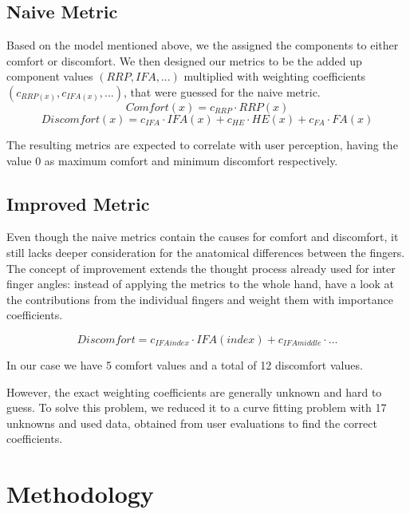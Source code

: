 \documentclass{sig-alternate-05-2015}
\begin{document}
\subsection{Naive Metric}


Based on the model mentioned above\cite{vink2012editorial}, we the assigned the components to either comfort or discomfort. We then designed our metrics to be the added up component values \begin{math}(RRP, IFA, ...)\end{math} multiplied with weighting coefficients \begin{math}(c_{RRP(x)}, c_{IFA(x)}, ...)\end{math}, that were guessed for the naive metric.
	\[
	Comfort(x) = c_{RRP}\cdot RRP(x)
	\]
	\[
	Discomfort(x) = c_{IFA}\cdot IFA(x)  +  c_{HE}\cdot HE(x)  +  c_{FA}\cdot FA(x)
	\]

The resulting metrics are expected to correlate with user perception, having the value 0 as maximum comfort and minimum discomfort respectively.


\subsection{Improved Metric}

Even though the naive metrics contain the causes for comfort and discomfort, it still lacks deeper consideration for the anatomical differences between the fingers.
The concept of improvement extends the thought process already used for inter finger angles: instead of applying the metrics to the whole hand, have a look at the contributions from the individual fingers and weight them with importance coefficients. 

	\[
	Discomfort = c_{IFAindex}\cdot IFA(index)  +  c_{IFAmiddle}\cdot...
	\]

In our case we have 5 comfort values and a total of 12 discomfort values. 

However, the exact weighting coefficients are generally unknown and hard to guess. To solve this problem, we reduced it to a curve fitting problem with 17 unknowns and used data, obtained from user evaluations to find the correct coefficients.

\section{Methodology}
\end{document}
